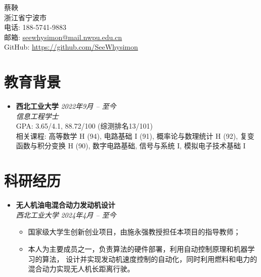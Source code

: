 \documentclass[a4paper,10pt]{article}
\begin{document}
	
	\begin{center}
		{\LARGE 蔡鞅}\\
		\vspace{0.1cm}
		浙江省宁波市 \\ 
		电话: 188-5741-9883 \\ 
		邮箱: \href{mailto:seewhysimon@mail.nwpu.edu.cn}{seewhysimon@mail.nwpu.edu.cn} \\ 
		GitHub: \href{https://github.com/SeeWhysimon}{https://github.com/SeeWhysimon} 
	\end{center}

\section*{教育背景}
\begin{itemize}[leftmargin=0.5cm]
    \item \textbf{西北工业大学} \hfill \textit{2022年9月 -- 至今} \\ 
    \textit{信息工程学士} \\ 
    GPA: 3.65/4.1, 88.72/100 (综测排名13/101) \\ 
    相关课程: 高等数学 H (94), 
                      电路基础 I (91), 
                      概率论与数理统计 H (92), 
                      复变函数与积分变换 H (90), 
                      数字电路基础, 
                      信号与系统 I, 
                      模拟电子技术基础 I
\end{itemize}

\section*{科研经历}
\begin{itemize}[leftmargin=0.5cm]
    \item \textbf{无人机油电混合动力发动机设计} \\ 
    \textit{西北工业大学} \hfill \textit{2024年4月 -- 至今} 
    
    \begin{itemize}
        \item 国家级大学生创新创业项目，由施永强教授担任本项目的指导教师；
        \item 本人为主要成员之一，负责算法的硬件部署，利用自动控制原理和机器学习的算法，
              设计并实现发动机速度控制的自动化，同时利用燃料和电力的混合动力实现无人机长距离行驶。
    \end{itemize}
    
\end{itemize}
\end{document}
